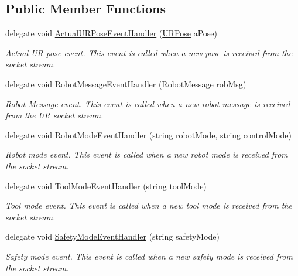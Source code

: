 \subsection*{Public Member Functions}
\begin{DoxyCompactItemize}
\item 
delegate void \hyperlink{class_robo_library_1_1_analyzer_a232f56c61a30de1de9e27021bf5dc77b}{Actual\+U\+R\+Pose\+Event\+Handler} (\hyperlink{class_robo_library_1_1_u_r_pose}{U\+R\+Pose} a\+Pose)
\begin{DoxyCompactList}\small\item\em Actual UR pose event. This event is called when a new pose is received from the socket stream.\end{DoxyCompactList}\item 
delegate void \hyperlink{class_robo_library_1_1_analyzer_a985396dd045b907a73d7b627b9bd07dc}{Robot\+Message\+Event\+Handler} (Robot\+Message rob\+Msg)
\begin{DoxyCompactList}\small\item\em Robot Message event. This event is called when a new robot message is received from the UR socket stream.\end{DoxyCompactList}\item 
delegate void \hyperlink{class_robo_library_1_1_analyzer_aa1d0cf635115d275b8488aab662610fa}{Robot\+Mode\+Event\+Handler} (string robot\+Mode, string control\+Mode)
\begin{DoxyCompactList}\small\item\em Robot mode event. This event is called when a new robot mode is received from the socket stream.\end{DoxyCompactList}\item 
delegate void \hyperlink{class_robo_library_1_1_analyzer_a6d2960ef27111be171f8c9d6a7d2a058}{Tool\+Mode\+Event\+Handler} (string tool\+Mode)
\begin{DoxyCompactList}\small\item\em Tool mode event. This event is called when a new tool mode is received from the socket stream.\end{DoxyCompactList}\item 
delegate void \hyperlink{class_robo_library_1_1_analyzer_ae03a29ceaec0141398e05cba9cbfba4d}{Safety\+Mode\+Event\+Handler} (string safety\+Mode)
\begin{DoxyCompactList}\small\item\em Safety mode event. This event is called when a new safety mode is received from the socket stream.\end{DoxyCompactList}\item 

\end{DoxyCompactItemize}
